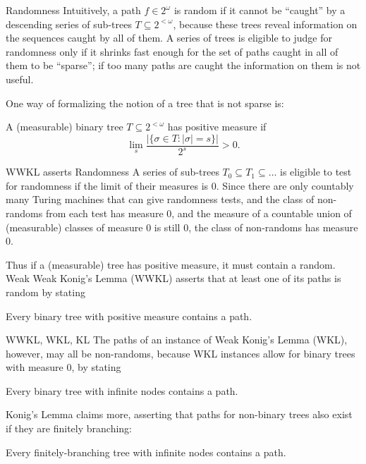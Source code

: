 \begin{frame}{Randomness}
  Intuitively, a path $f\in2^\omega$ is random if it cannot be ``caught''
  by a descending series of sub-trees $T\subseteq2^{<\omega}$, because
  these trees reveal information on the sequences caught by all of them. A
  series of trees is eligible to judge for randomness only if it shrinks
  fast enough for the set of paths caught in all of them to be ``sparse'';
  if too many paths are caught the information on them is not useful.

  \vspace{1em}
  One way of formalizing the notion of a tree that is not sparse is:
  \begin{define*}
    A (measurable) binary tree $T\subseteq2^{<\omega}$ has positive measure
    if
    \[\lim_s \frac{|\{\sigma\in T: |\sigma|=s\}|}{2^s} >0.\]
  \end{define*}
\end{frame}

\begin{frame}{WWKL asserts Randomness}
  A series of sub-trees $T_0\subseteq T_1\subseteq\ldots$ is eligible to
  test for randomness if the limit of their measures is 0. Since there are
  only countably many Turing machines that can give randomness tests,
  and the class of non-randoms from each test has measure 0, and the
  measure of a countable union of (measurable) classes of measure 0 is
  still 0, the class of non-randoms has measure 0.

  \vspace{2em}
  Thus if a (measurable) tree has positive measure, it must contain a
  random. Weak Weak Konig's Lemma (WWKL) asserts that at least one of its
  paths is random by stating
  \begin{thm*}
    Every binary tree with positive measure contains a path.
  \end{thm*}
\end{frame}

\begin{frame}{WWKL, WKL, KL}
  The paths of an instance of Weak Konig's Lemma (WKL), however, may
  all be non-randoms, because WKL instances allow for binary trees with
  measure 0, by stating
  \begin{thm*}
    Every binary tree with infinite nodes contains a path.
  \end{thm*}

  \vspace{2em}
  Konig's Lemma claims more, asserting that paths for non-binary
  trees also exist if they are finitely branching: 
  \begin{thm*}
    Every finitely-branching tree with infinite nodes contains a path.
  \end{thm*}
\end{frame}

